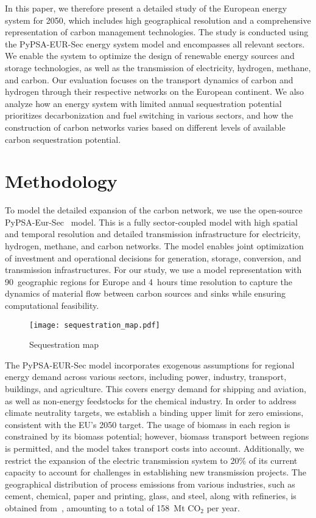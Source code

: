 \documentclass[conference]{IEEEtran}
\begin{document}
In this paper, we therefore present a detailed study of the European energy system for 2050, which includes high geographical resolution and a comprehensive representation of carbon management technologies. The study is conducted using the PyPSA-EUR-Sec energy system model and encompasses all relevant sectors. We enable the system to optimize the design of renewable energy sources and storage technologies, as well as the transmission of electricity, hydrogen, methane, and carbon. Our evaluation focuses on the transport dynamics of carbon and hydrogen through their respective networks on the European continent. We also analyze how an energy system with limited annual sequestration potential prioritizes decarbonization and fuel switching in various sectors, and how the construction of carbon networks varies based on different levels of available carbon sequestration potential.


\section{Methodology}
\label{sec:methodology}

To model the detailed expansion of the carbon network, we use the open-source PyPSA-Eur-Sec~\cite{PyPSAEurSecSectorCoupledOpen2023} model. This is a fully sector-coupled model with high spatial and temporal resolution and detailed transmission infrastructure for electricity, hydrogen, methane, and carbon networks. The model enables joint optimization of investment and operational decisions for generation, storage, conversion, and transmission infrastructures. For our study, we use a model representation with 90~geographic regions for Europe and 4~hours time resolution to capture the dynamics of material flow between carbon sources and sinks while ensuring computational feasibility.

\begin{figure}
    \centering
    \texttt{[image: sequestration\_map.pdf]}
    \caption{Sequestration map}
    \label{fig:sequestration_map}
\end{figure}

The PyPSA-EUR-Sec model incorporates exogenous assumptions for regional energy demand across various sectors, including power, industry, transport, buildings, and agriculture. This covers energy demand for shipping and aviation, as well as non-energy feedstocks for the chemical industry. In order to address climate neutrality targets, we establish a binding upper limit for zero emissions, consistent with the EU's 2050 target. The usage of biomass in each region is constrained by its biomass potential; however, biomass transport between regions is permitted, and the model takes transport costs into account. Additionally, we restrict the expansion of the electric transmission system to 20\% of its current capacity to account for challenges in establishing new transmission projects. The geographical distribution of process emissions from various industries, such as cement, chemical, paper and printing, glass, and steel, along with refineries, is obtained from~\cite{piamanzGeoreferencedIndustrialSites2018}, amounting to a total of 158~Mt CO$_2$ per year.
\end{document}
